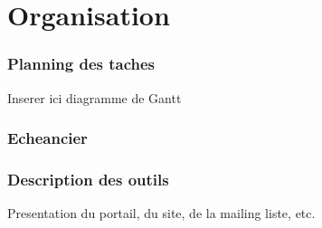 \chapter{Organisation}



\subsection{Planning des taches}

Inserer ici diagramme de Gantt




\subsection{Echeancier}




\subsection{ Description des outils}

Presentation du portail, du site, de la mailing liste, etc.





